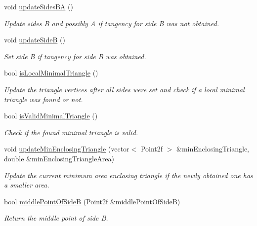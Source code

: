 \begin{DoxyCompactItemize}
void \hyperlink{classmultiscale_1_1MinEnclosingTriangleFinder_a12f1835531784519d618b86e889af06d}{update\-Sides\-B\-A} ()
\begin{DoxyCompactList}\small\item\em Update sides B and possibly A if tangency for side B was not obtained. \end{DoxyCompactList}\item 
void \hyperlink{classmultiscale_1_1MinEnclosingTriangleFinder_ab25b3b5dbe05cb06e83a49cd28b3116f}{update\-Side\-B} ()
\begin{DoxyCompactList}\small\item\em Set side B if tangency for side B was obtained. \end{DoxyCompactList}\item 
bool \hyperlink{classmultiscale_1_1MinEnclosingTriangleFinder_a97747be924fe1d8efaf6cad9d635419b}{is\-Local\-Minimal\-Triangle} ()
\begin{DoxyCompactList}\small\item\em Update the triangle vertices after all sides were set and check if a local minimal triangle was found or not. \end{DoxyCompactList}\item 
bool \hyperlink{classmultiscale_1_1MinEnclosingTriangleFinder_a4f9c533c8d5de8b95c38b71f50a5e00c}{is\-Valid\-Minimal\-Triangle} ()
\begin{DoxyCompactList}\small\item\em Check if the found minimal triangle is valid. \end{DoxyCompactList}\item 
void \hyperlink{classmultiscale_1_1MinEnclosingTriangleFinder_a8608cacc403c71d7ac9bc017d7b14e0c}{update\-Min\-Enclosing\-Triangle} (vector$<$ Point2f $>$ \&min\-Enclosing\-Triangle, double \&min\-Enclosing\-Triangle\-Area)
\begin{DoxyCompactList}\small\item\em Update the current minimum area enclosing triangle if the newly obtained one has a smaller area. \end{DoxyCompactList}\item 
bool \hyperlink{classmultiscale_1_1MinEnclosingTriangleFinder_a664bee3e51e007b97fa21a92830f9066}{middle\-Point\-Of\-Side\-B} (Point2f \&middle\-Point\-Of\-Side\-B)
\begin{DoxyCompactList}\small\item\em Return the middle point of side B. \end{DoxyCompactList}\item 

\end{DoxyCompactItemize}
